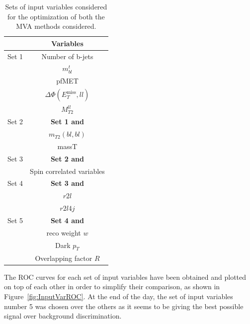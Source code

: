 \documentclass[a4paper, 10pt, openright]{report}
\begin{document}
\begin{appendices}
\begin{table}
\begin{center}
\begin{tabular}{ c|c } 
 \hline
  & Variables \\
\hline
\multirow{1}{*}{Set 1} & Number of b-jets \\
& $m_{bl}^t$ \\
& pf\ac{MET} \\
& $\Delta \Phi(E_{T}^{\text{miss}}, ll)$ \\
& $M_{T2}^{ll}$ \\
\hline
Set 2 & \textbf{Set 1 and} \\
& $m_{T2}(bl, bl)$ \\
& massT \\
\hline
Set 3 & \textbf{Set 2 and} \\
& Spin correlated variables \\
\hline
Set 4 & \textbf{Set 3 and} \\
& $r2l$ \\
& $r2l4j$ \\
\hline
Set 5 & \textbf{Set 4 and} \\
& reco weight $w$ \\
& Dark $p_T$ \\
& Overlapping factor $R$ \\
 \hline
\end{tabular}
\caption{Sets of input variables considered for the optimization of both the \ac{MVA} methods considered.}
\label{table:sets}
\end{center}
\end{table}

The \ac{ROC} curves for each set of input variables have been obtained and plotted on top of each other in order to simplify their comparison, as shown in Figure~\ref{fig:InputVarROC}. At the end of the day, the set of input variables number 5 was chosen over the others as it seems to be giving the best possible signal over background discrimination.


\end{appendices}
\end{document}

